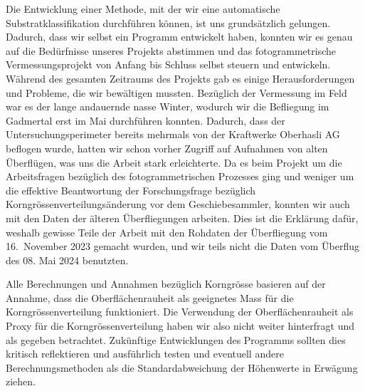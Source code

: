 \documentclass[12pt]{article}
\begin{document}
    Die Entwicklung einer Methode, mit der wir eine automatische Substratklassifikation durchführen können, ist uns grundsätzlich gelungen.
    Dadurch, dass wir selbst ein Programm entwickelt haben, konnten wir es genau auf die Bedürfnisse unseres Projekts abstimmen und das fotogrammetrische Vermessungsprojekt von Anfang bis Schluss selbst steuern und entwickeln.
    Während des gesamten Zeitraums des Projekts gab es einige Herausforderungen und Probleme, die wir bewältigen mussten.
    Bezüglich der Vermessung im Feld war es der lange andauernde nasse Winter, wodurch wir die Befliegung im Gadmertal erst im Mai durchführen konnten.
    Dadurch, dass der Untersuchungsperimeter bereits mehrmals von der Kraftwerke Oberhasli AG beflogen wurde, hatten wir schon vorher Zugriff auf Aufnahmen von alten Überflügen, was uns die Arbeit stark erleichterte.
    Da es beim Projekt um die Arbeitsfragen bezüglich des fotogrammetrischen Prozesses ging und weniger um die effektive Beantwortung der Forschungsfrage bezüglich Korngrössenverteilungsänderung vor dem Geschiebesammler, konnten wir auch mit den Daten der älteren Überfliegungen arbeiten.
    Dies ist die Erklärung dafür, weshalb gewisse Teile der Arbeit mit den Rohdaten der Überfliegung vom 16.\ November 2023 gemacht wurden, und wir teils nicht die Daten vom Überflug des 08. Mai 2024 benutzten.

    Alle Berechnungen und Annahmen bezüglich Korngrösse basieren auf der Annahme, dass die Oberflächenrauheit als geeignetes Mass für die Korngrössenverteilung funktioniert.
    Die Verwendung der Oberflächenrauheit als Proxy für die Korngrössenverteilung haben wir also nicht weiter hinterfragt und als gegeben betrachtet.
    Zukünftige Entwicklungen des Programms sollten dies kritisch reflektieren und ausführlich testen und eventuell andere Berechnungsmethoden als die Standardabweichung der Höhenwerte in Erwägung ziehen.
\end{document}
